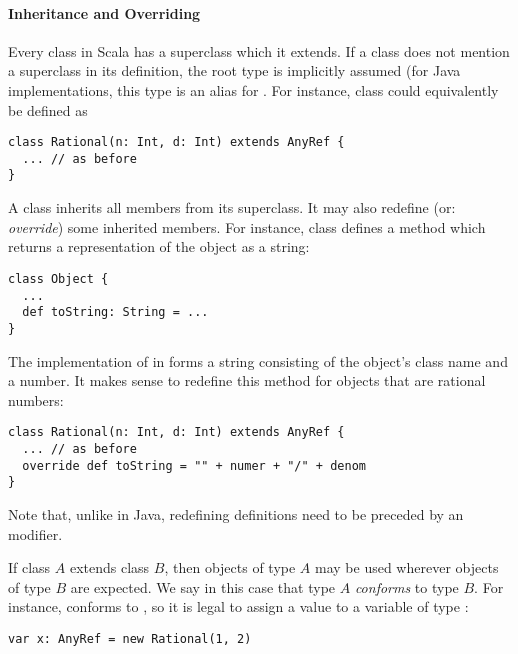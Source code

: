 \paragraph{Inheritance and Overriding}
Every class in Scala has a superclass which it extends.  
If a class
does not mention a superclass in its definition, the root type
 is implicitly assumed (for Java implementations,
this type is an alias for . For instance, class
 could equivalently be defined as
\begin{lstlisting}
class Rational(n: Int, d: Int) extends AnyRef {
  ... // as before
}
\end{lstlisting}
A class inherits all members from its superclass. It may also redefine
(or: {\em override}) some inherited members. For instance, class
 defines
a method
 which returns a representation of the object as a string:
\begin{lstlisting}
class Object {
  ...
  def toString: String = ...
}
\end{lstlisting}
The implementation of  in 
forms a string consisting of the object's class name and a number. It
makes sense to redefine this method for objects that are rational
numbers:
\begin{lstlisting}
class Rational(n: Int, d: Int) extends AnyRef {
  ... // as before
  override def toString = "" + numer + "/" + denom
}
\end{lstlisting}
Note that, unlike in Java, redefining definitions need to be preceded
by an  modifier.

If class $A$ extends class $B$, then objects of type $A$ may be used
wherever objects of type $B$ are expected. We say in this case that
type $A$ {\em conforms} to type $B$.  For instance, 
conforms to , so it is legal to assign a 
value to a variable of type :
\begin{lstlisting}
var x: AnyRef = new Rational(1, 2)
\end{lstlisting}

